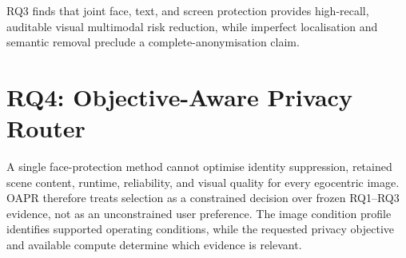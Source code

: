 \documentclass[10pt,twocolumn]{IEEEtran}
\begin{document}
RQ3 finds that joint face, text, and screen protection provides high-recall,
auditable visual multimodal risk reduction, while imperfect localisation and
semantic removal preclude a complete-anonymisation claim.

\clearpage

\section{RQ4: Objective-Aware Privacy Router}
\label{sec:rq4}

A single face-protection method cannot optimise identity suppression, retained
scene content, runtime, reliability, and visual quality for every egocentric
image. OAPR therefore treats selection as a constrained decision over frozen
RQ1--RQ3 evidence, not as an unconstrained user preference. The image condition
profile identifies supported operating conditions, while the requested
privacy objective and available compute determine which evidence is relevant.
\end{document}

